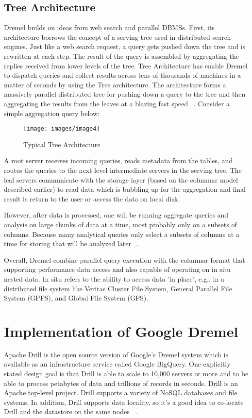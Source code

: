 \documentclass[9pt,twocolumn,twoside]{styles/osajnl}
\begin{document}
\subsection{Tree Architecture}
Dremel builds on ideas from web search and parallel DBMSs. First, its architecture borrows the concept of a serving tree used in distributed search engines. Just like a web search request, a query gets pushed down the tree and is rewritten at each step. The result of the query is assembled by aggregating the replies received from lower levels of the tree. Tree Architecture has enable Dremel to dispatch queries and collect results across tens of thousands of machines in a matter of seconds by using the Tree architecture. The architecture forms a massively parallel distributed tree for pushing down a query to the tree and then aggregating the results from the leaves at a blazing fast speed ~\cite{twitter-dremel}. Consider a simple aggregation query below:

\begin{figure}[H]
 \centering
\texttt{[image: images/image4]}
\caption{Typical Tree Architecture ~\cite{book-hadoop}} 
\end{figure}

A root server receives incoming queries, reads metadata from the tables, and routes the queries to the next level intermediate servers in the serving tree. The leaf servers communicate with the storage layer (based on the columnar model described earlier) to read data which is bubbling up for the aggregation and final result is return to the user  or access the data on local disk. 

However, after data is processed, one will be running aggregate queries and analysis on large chunks of data at a time, most probably only on a subsets of columns. Because many analytical queries only select a subsets of columns at a time for storing that will be analyzed later ~\cite{book-hadoop}.

Overall, Dremel combine parallel query execution with the columnar format that supporting  performance data access and also capable of operating on in situ nested data. In situ refers to the ability to access data 'in place', e.g., in a distributed file system like Veritas Cluster File System,  General Parallel File System (GPFS), and  Global File System (GFS). 

\section{Implementation of Google Dremel }
Apache Drill is the open source version of Google's Dremel system which is available as an infrastructure service called Google BigQuery. One explicitly stated design goal is that Drill is able to scale to 10,000 servers or more and to be able to process petabytes of data and trillions of records in seconds. Drill is an Apache top-level project.  Drill supports a variety of NoSQL databases and file systems. In addition, Drill supports data locality, so it's a good idea to co-locate Drill and the datastore on the same nodes ~\cite{wiki-drill}.
\end{document}
